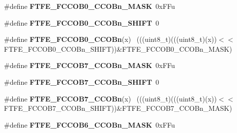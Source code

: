 \begin{DoxyCompactItemize}
\item 
\hypertarget{group___f_t_f_e___register___masks_ga7499ddf982938188b06763fed98527fa}{}\#define {\bfseries F\+T\+F\+E\+\_\+\+F\+C\+C\+O\+B0\+\_\+\+C\+C\+O\+Bn\+\_\+\+M\+A\+S\+K}~0x\+F\+Fu\label{group___f_t_f_e___register___masks_ga7499ddf982938188b06763fed98527fa}

\item 
\hypertarget{group___f_t_f_e___register___masks_gadb81c85946e5b09d2a0a47521b4e2f04}{}\#define {\bfseries F\+T\+F\+E\+\_\+\+F\+C\+C\+O\+B0\+\_\+\+C\+C\+O\+Bn\+\_\+\+S\+H\+I\+F\+T}~0\label{group___f_t_f_e___register___masks_gadb81c85946e5b09d2a0a47521b4e2f04}

\item 
\hypertarget{group___f_t_f_e___register___masks_gae451acc25e1ada400eb3058839da29f0}{}\#define {\bfseries F\+T\+F\+E\+\_\+\+F\+C\+C\+O\+B0\+\_\+\+C\+C\+O\+Bn}(x)                                      ~(((uint8\+\_\+t)(((uint8\+\_\+t)(x))$<$$<$F\+T\+F\+E\+\_\+\+F\+C\+C\+O\+B0\+\_\+\+C\+C\+O\+Bn\+\_\+\+S\+H\+I\+F\+T))\&F\+T\+F\+E\+\_\+\+F\+C\+C\+O\+B0\+\_\+\+C\+C\+O\+Bn\+\_\+\+M\+A\+S\+K)\label{group___f_t_f_e___register___masks_gae451acc25e1ada400eb3058839da29f0}

\item 
\hypertarget{group___f_t_f_e___register___masks_ga6f03287a2909b3e7fa73cc115291fec7}{}\#define {\bfseries F\+T\+F\+E\+\_\+\+F\+C\+C\+O\+B7\+\_\+\+C\+C\+O\+Bn\+\_\+\+M\+A\+S\+K}~0x\+F\+Fu\label{group___f_t_f_e___register___masks_ga6f03287a2909b3e7fa73cc115291fec7}

\item 
\hypertarget{group___f_t_f_e___register___masks_ga4b685969e78b9b85e14c8bf4561daf21}{}\#define {\bfseries F\+T\+F\+E\+\_\+\+F\+C\+C\+O\+B7\+\_\+\+C\+C\+O\+Bn\+\_\+\+S\+H\+I\+F\+T}~0\label{group___f_t_f_e___register___masks_ga4b685969e78b9b85e14c8bf4561daf21}

\item 
\hypertarget{group___f_t_f_e___register___masks_ga4c1fb19f76c24d3bd7b407b4b715065c}{}\#define {\bfseries F\+T\+F\+E\+\_\+\+F\+C\+C\+O\+B7\+\_\+\+C\+C\+O\+Bn}(x)                                      ~(((uint8\+\_\+t)(((uint8\+\_\+t)(x))$<$$<$F\+T\+F\+E\+\_\+\+F\+C\+C\+O\+B7\+\_\+\+C\+C\+O\+Bn\+\_\+\+S\+H\+I\+F\+T))\&F\+T\+F\+E\+\_\+\+F\+C\+C\+O\+B7\+\_\+\+C\+C\+O\+Bn\+\_\+\+M\+A\+S\+K)\label{group___f_t_f_e___register___masks_ga4c1fb19f76c24d3bd7b407b4b715065c}

\item 
\hypertarget{group___f_t_f_e___register___masks_ga5143a0f11e338ce6e900d67a58e9ce55}{}\#define {\bfseries F\+T\+F\+E\+\_\+\+F\+C\+C\+O\+B6\+\_\+\+C\+C\+O\+Bn\+\_\+\+M\+A\+S\+K}~0x\+F\+Fu\label{group___f_t_f_e___register___masks_ga5143a0f11e338ce6e900d67a58e9ce55}


\end{DoxyCompactItemize}
